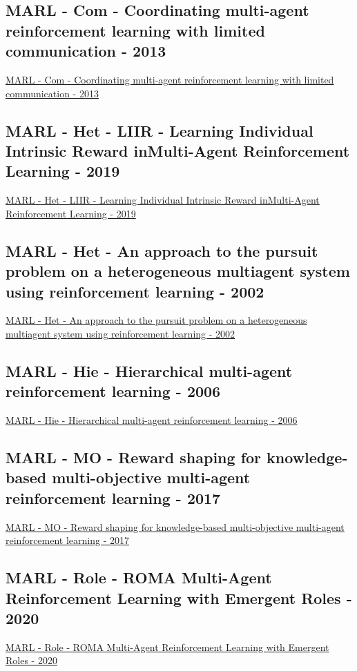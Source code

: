 \subsection{MARL - Com - Coordinating multi-agent reinforcement learning with limited communication - 2013}
\href{https://dl.acm.org/doi/abs/10.5555/2484920.2485093}{MARL - Com - Coordinating multi-agent reinforcement learning with limited communication - 2013}

\subsection{MARL - Het - LIIR - Learning Individual Intrinsic Reward inMulti-Agent Reinforcement Learning - 2019}
\href{https://proceedings.neurips.cc/paper/2019/hash/07a9d3fed4c5ea6b17e80258dee231fa-Abstract.html}{MARL - Het - LIIR - Learning Individual Intrinsic Reward inMulti-Agent Reinforcement Learning - 2019}

\subsection{MARL - Het - An approach to the pursuit problem on a heterogeneous multiagent system using reinforcement learning - 2002}
\href{https://www.sciencedirect.com/science/article/abs/pii/S092188900300040X}{MARL - Het - An approach to the pursuit problem on a heterogeneous multiagent system using reinforcement learning - 2002}

\subsection{MARL - Hie - Hierarchical multi-agent reinforcement learning - 2006}
\href{https://link.springer.com/article/10.1007/s10458-006-7035-4}{MARL - Hie - Hierarchical multi-agent reinforcement learning - 2006}

\subsection{MARL - MO - Reward shaping for knowledge-based multi-objective multi-agent reinforcement learning - 2017}
\href{https://www.cambridge.org/core/journals/knowledge-engineering-review/article/reward-shaping-for-knowledgebased-multiobjective-multiagent-reinforcement-learning/75F1507F7CAC7C6625F87AE7CD344D52}{MARL - MO - Reward shaping for knowledge-based multi-objective multi-agent reinforcement learning - 2017}

\subsection{MARL - Role - ROMA Multi-Agent Reinforcement Learning with Emergent Roles - 2020}
\href{http://proceedings.mlr.press/v119/wang20f.html}{MARL - Role - ROMA Multi-Agent Reinforcement Learning with Emergent Roles - 2020}

